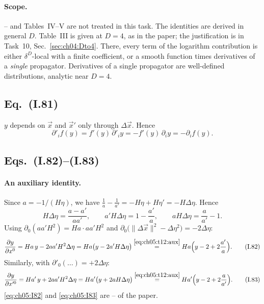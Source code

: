 \paragraph{Scope.}
-- and Tables~IV--V are not treated in this task.
The identities are derived in general $D$. Table~III is given at $D=4$, as in the paper; the justification is in Task~10, Sec.~\ref{sec:ch04:Dto4}.
There, every term of the logarithm contribution is either $\delta^D$-local with a finite coefficient, or a smooth function times derivatives of a \emph{single} propagator.
Derivatives of a single propagator are well-defined distributions, analytic near $D=4$.

\subsection[Eq. (I.81)]{Eq.~(I.81) \tD}

$y$ depends on $\vec x$ and $\vec x'$ only through $\Delta\vec x$. Hence
\begin{equation}
\partial'_if(y)=f'(y)\,\partial'_iy=-f'(y)\,\partial_iy=-\partial_if(y).
\tag{I.81}\label{eq:ch05:I81}
\end{equation}

\subsection[Eqs. (I.82)--(I.83)]{Eqs.~(I.82)--(I.83) \tD}

\paragraph{An auxiliary identity.} Since $a=-1/(H\eta)$, we have $\frac1a-\frac1{a'}=-H\eta+H\eta'=-H\Delta\eta$. Hence
\begin{equation}
H\Delta\eta=\frac{a-a'}{aa'},\qquad a'H\Delta\eta=1-\frac{a'}a,\qquad aH\Delta\eta=\frac a{a'}-1 .
\label{eq:ch05:t12:aux}
\end{equation}
Using $\partial_0(aa'H^2)=Ha\cdot aa'H^2$ and $\partial_0\big(\|\Delta\vec x\|^2-\Delta\eta^2\big)=-2\Delta\eta$:
\begin{equation}
\frac{\partial y}{\partial x^0}=Ha\,y-2aa'H^2\Delta\eta=Ha\big(y-2a'H\Delta\eta\big)\overset{\eqref{eq:ch05:t12:aux}}{=}Ha\Big(y-2+2\frac{a'}a\Big).
\tag{I.82}\label{eq:ch05:I82}
\end{equation}
Similarly, with $\partial'_0(\ldots)=+2\Delta\eta$:
\begin{equation}
\frac{\partial y}{\partial x'^0}=Ha'\,y+2aa'H^2\Delta\eta=Ha'\big(y+2aH\Delta\eta\big)\overset{\eqref{eq:ch05:t12:aux}}{=}Ha'\Big(y-2+2\frac a{a'}\Big).
\tag{I.83}\label{eq:ch05:I83}
\end{equation}
\eqref{eq:ch05:I82} and \eqref{eq:ch05:I83} are -- of the paper.

